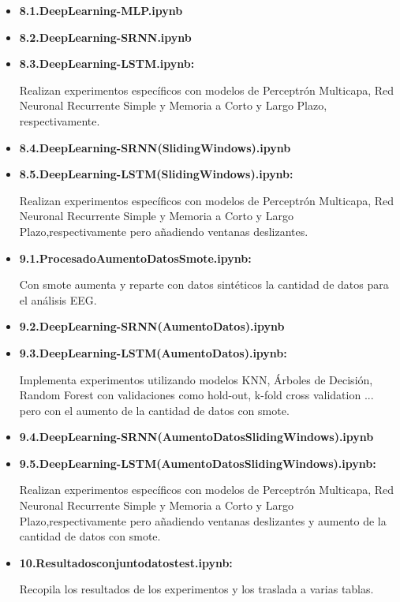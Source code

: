 \begin{itemize}
\begin{itemize}
   \item
    \textbf{8.1.DeepLearning-MLP.ipynb}
   \item
    \textbf{8.2.DeepLearning-SRNN.ipynb} 
   \item
    \textbf{8.3.DeepLearning-LSTM.ipynb:}      

    Realizan experimentos específicos con modelos de Perceptrón Multicapa, Red Neuronal Recurrente Simple y Memoria a Corto y Largo Plazo, respectivamente.
    
   \item
    \textbf{8.4.DeepLearning-SRNN(SlidingWindows).ipynb}
   \item
    \textbf{8.5.DeepLearning-LSTM(SlidingWindows).ipynb:}
    
    Realizan experimentos específicos con modelos de Perceptrón Multicapa, Red Neuronal Recurrente Simple y Memoria a Corto y Largo Plazo,respectivamente pero añadiendo ventanas deslizantes.
    
   \item
    \textbf{9.1.ProcesadoAumentoDatosSmote.ipynb:} 
    
    Con smote aumenta y reparte con datos sintéticos la cantidad de datos para el análisis EEG. 
    
   \item
    \textbf{9.2.DeepLearning-SRNN(AumentoDatos).ipynb}
   \item
    \textbf{9.3.DeepLearning-LSTM(AumentoDatos).ipynb:}
    
    Implementa experimentos utilizando modelos KNN, Árboles de Decisión, Random Forest con validaciones como hold-out, k-fold cross validation ... pero con el aumento de la cantidad de datos con smote.
    
   \item
    \textbf{9.4.DeepLearning-SRNN(AumentoDatosSlidingWindows).ipynb}
   \item
   \textbf{ 9.5.DeepLearning-LSTM(AumentoDatosSlidingWindows).ipynb:} 
    
    Realizan experimentos específicos con modelos de Perceptrón Multicapa, Red Neuronal Recurrente Simple y Memoria a Corto y Largo Plazo,respectivamente pero añadiendo ventanas deslizantes y aumento de la cantidad de datos con smote.
    
   \item
    \textbf{10.Resultadosconjuntodatostest.ipynb:} 
    
    Recopila los resultados de los experimentos y los traslada a varias tablas.
   \end{itemize} 
  \end{itemize} 
  
